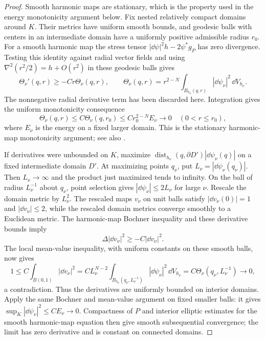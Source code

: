 \begin{proof}
Smooth harmonic maps are stationary, which is the property used in the
energy monotonicity argument below.  Fix nested relatively
compact domains around $K$.  Their metrics have uniform smooth bounds,
and geodesic balls with centers in an intermediate domain have a
uniformly positive admissible radius $r_0$.
For a smooth harmonic map the stress tensor
$|\dd\psi|^2h-2\psi^*g_P$ has zero divergence.  Testing this identity
against radial vector fields and using
$\nabla^2(r^2/2)=h+O(r^2)$ in these geodesic balls gives
\[
 \Theta_\nu'(q,r)\ge-Cr\Theta_\nu(q,r),\qquad
 \Theta_\nu(q,r)=r^{2-N}
       \int_{B_{h_\nu}(q,r)}|\dd\psi_\nu|^2\,\dd V_{h_\nu}.
\]
The nonnegative radial derivative term has been discarded here.
Integration gives the uniform monotonicity consequence
\begin{equation}
 \Theta_\nu(q,r)\le C\Theta_\nu(q,r_0)
     \le Cr_0^{2-N}E_\nu\longrightarrow0
       \quad(0<r\le r_0),
 \label{eq:harmonic-map-monotonicity}
\end{equation}
where $E_\nu$ is the energy on a fixed larger domain.  This is the
stationary harmonic-map monotonicity argument; see also \cite{Lin}.

If derivatives were unbounded on $K$, maximize
$\operatorname{dist}_{h_\nu}(q,\partial D')
 |\dd\psi_\nu(q)|$ on a fixed intermediate domain $D'$.
At maximizing points $q_\nu$, put
$L_\nu=|\dd\psi_\nu(q_\nu)|$.  Then $L_\nu\to\infty$ and the product
just maximized tends to infinity.  On the ball of radius
$L_\nu^{-1}$ about $q_\nu$, point selection gives
$|\dd\psi_\nu|\le2L_\nu$ for large $\nu$.  Rescale the domain metric by
$L_\nu^2$.  The rescaled maps $v_\nu$ on unit balls satisfy
$|\dd v_\nu(0)|=1$ and $|\dd v_\nu|\le2$, while the rescaled domain
metrics converge smoothly to a Euclidean metric.  The harmonic-map
Bochner inequality and these derivative bounds imply
\[
 \Delta|\dd v_\nu|^2\ge-C|\dd v_\nu|^2.
\]
The local mean-value inequality, with uniform constants on these
smooth balls, now gives
\[
 1\le C\int_{B(0,1)}|\dd v_\nu|^2
   =C L_\nu^{N-2}
          \int_{B_{h_\nu}(q_\nu,L_\nu^{-1})}
                         |\dd\psi_\nu|^2\,\dd V_{h_\nu}
   =C\Theta_\nu(q_\nu,L_\nu^{-1})\longrightarrow0,
\]
a contradiction.  Thus the derivatives are uniformly bounded on
interior domains.  Apply the same Bochner and mean-value argument on
fixed smaller balls: it gives
$\sup_K|\dd\psi_\nu|^2\le C E_\nu\to0$.
Compactness of $P$ and interior elliptic estimates for the smooth
harmonic-map equation then give smooth subsequential convergence; the
limit has zero derivative and is constant on connected domains.
\end{proof}

